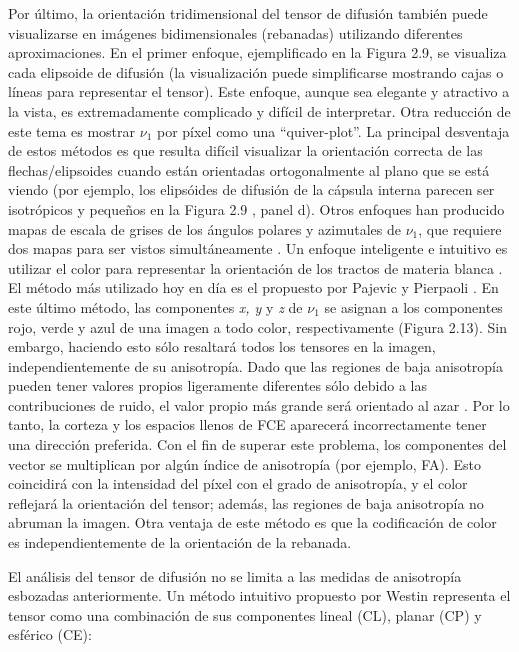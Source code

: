 \documentclass[12pt,a5,twoside]{book}
\begin{document}
Por último, la orientación tridimensional del tensor de difusión también puede visualizarse en imágenes bidimensionales (rebanadas) utilizando diferentes aproximaciones. En el primer enfoque, ejemplificado en la Figura 2.9, se visualiza cada elipsoide de difusión (la visualización puede simplificarse mostrando cajas o líneas para representar el tensor). Este enfoque, aunque sea elegante y atractivo a la vista, es extremadamente complicado y difícil de interpretar. Otra reducción de este tema es mostrar $\nu_1$ por píxel como una ``quiver-plot''. La principal desventaja de estos métodos es que resulta difícil visualizar la orientación correcta de las flechas/elipsoides cuando están orientadas ortogonalmente al plano que se está viendo (por ejemplo, los elipsóides de difusión de la cápsula interna parecen ser isotrópicos y pequeños en la Figura 2.9 , panel d). Otros enfoques han producido mapas de escala de grises de los ángulos polares y azimutales de $\nu_1$, que requiere dos mapas para ser vistos simultáneamente \citep{Conturo_1996,Ulug_1994}. Un enfoque inteligente e intuitivo es utilizar el color para representar la orientación de los tractos de materia blanca \citep{Douek_1991,Jones_1997,Coremans_1994,Nakada_1995,Pierpaoli_1997,Jones_1997}. El método más utilizado hoy en día es el propuesto por Pajevic y Pierpaoli \citep{Pajevic_2000}. En este último método, las componentes {\it x, y} y {\it z} de $\nu_1$ se asignan a los componentes rojo, verde y azul de una imagen a todo color, respectivamente (Figura 2.13). Sin embargo, haciendo esto sólo resaltará todos los tensores en la imagen, independientemente de su anisotropía. Dado que las regiones de baja anisotropía pueden tener valores propios ligeramente diferentes sólo debido a las contribuciones de ruido, el valor propio más grande será orientado al azar \citep{Bastin_1998}. Por lo tanto, la corteza y los espacios llenos de FCE aparecerá incorrectamente tener una dirección preferida. Con el fin de superar este problema, los componentes del vector se multiplican por algún índice de anisotropía (por ejemplo, FA). Esto coincidirá con la intensidad del píxel con el grado de anisotropía, y el color reflejará la orientación del tensor; además, las regiones de baja anisotropía no abruman la imagen. Otra ventaja de este método es que la codificación de color es independientemente de la orientación de la rebanada.

El análisis del tensor de difusión no se limita a las medidas de anisotropía esbozadas anteriormente. Un método intuitivo propuesto por Westin \citep{Westin_1997} representa el tensor como una combinación de sus componentes lineal (CL), planar (CP) y esférico (CE):
\end{document}
